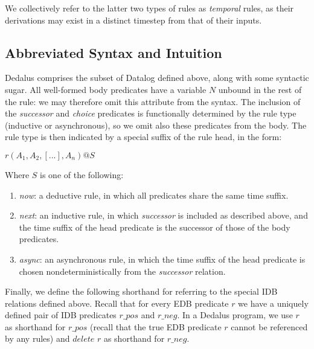 \documentclass{acm_proc_article-sp-sigmod09}
\begin{document}
We collectively refer to the latter two types of rules as {\em temporal} rules,
as their derivations may exist in a distinct timestep from that of their
inputs.

\subsection{Abbreviated Syntax and Intuition}

Dedalus comprises the subset of Datalog defined above, along with some syntactic sugar.  All well-formed body predicates have a 
variable $N$ unbound in the rest of the rule: we may therefore omit this attribute from the syntax.  The inclusion of the \emph{successor}
and \emph{choice} predicates is functionally determined by the rule type (inductive or asynchronous), so we omit also these predicates
from the body.  The rule type is then indicated by a special suffix of the rule head, in the form:

$r(A_{1},A_{2},[...],A_{n})@S$

Where $S$ is one of the following:
\begin{enumerate}
\item \emph{now}: a deductive rule, in which all predicates share the same time suffix.
\item \emph{next}: an inductive rule, in which \emph{successor} is included as described above, and the time suffix of the head predicate
is the successor of those of the body predicates. 
\item \emph{async}: an asynchronous rule, in which the time suffix of the head predicate is chosen nondeterministically from the \emph{successor} 
relation.
\end{enumerate}

Finally, we define the following shorthand for referring to the special IDB relations defined above.  Recall that for every EDB predicate $r$
we have a uniquely defined pair of IDB predicates $r\_pos$ and $r\_neg$.  In a Dedalus program, we use $r$ as shorthand for $r\_pos$ 
(recall that the true EDB predicate $r$ cannot be referenced by any rules) and $delete$ $r$ as shorthand for $r\_neg$.
\end{document}
